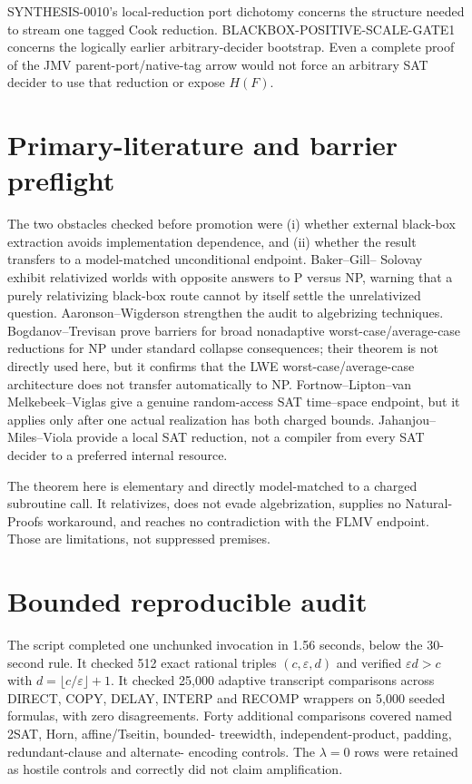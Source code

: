 \documentclass[11pt]{article}
\begin{document}
SYNTHESIS-0010's local-reduction port dichotomy concerns the structure needed
to stream one tagged Cook reduction.  BLACKBOX-POSITIVE-SCALE-GATE1 concerns
the logically earlier arbitrary-decider bootstrap.  Even a complete proof of
the JMV parent-port/native-tag arrow would not force an arbitrary SAT decider
to use that reduction or expose $H(F)$.

\section{Primary-literature and barrier preflight}

The two obstacles checked before promotion were (i) whether external
black-box extraction avoids implementation dependence, and (ii) whether the
result transfers to a model-matched unconditional endpoint.  Baker--Gill--
Solovay exhibit relativized worlds with opposite answers to P versus NP,
warning that a purely relativizing black-box route cannot by itself settle
the unrelativized question.  Aaronson--Wigderson strengthen the audit to
algebrizing techniques.  Bogdanov--Trevisan prove barriers for broad
nonadaptive worst-case/average-case reductions for NP under standard collapse
consequences; their theorem is not directly used here, but it confirms that
the LWE worst-case/average-case architecture does not transfer automatically
to NP.  Fortnow--Lipton--van Melkebeek--Viglas give a genuine random-access
SAT time--space endpoint, but it applies only after one actual realization
has both charged bounds.  Jahanjou--Miles--Viola provide a local SAT reduction,
not a compiler from every SAT decider to a preferred internal resource.

The theorem here is elementary and directly model-matched to a charged
subroutine call.  It relativizes, does not evade algebrization, supplies no
Natural-Proofs workaround, and reaches no contradiction with the FLMV
endpoint.  Those are limitations, not suppressed premises.

\section{Bounded reproducible audit}

The script
 completed one
unchunked invocation in 1.56 seconds, below the 30-second rule.  It checked
512 exact rational triples $(c,\varepsilon,d)$ and verified
$\varepsilon d>c$ with $d=\lfloor c/\varepsilon\rfloor+1$.  It checked
25,000 adaptive transcript comparisons across DIRECT, COPY, DELAY, INTERP and
RECOMP wrappers on 5,000 seeded formulas, with zero disagreements.  Forty
additional comparisons covered named 2SAT, Horn, affine/Tseitin, bounded-
treewidth, independent-product, padding, redundant-clause and alternate-
encoding controls.  The $\lambda=0$ rows were retained as hostile controls
and correctly did not claim amplification.
\end{document}
